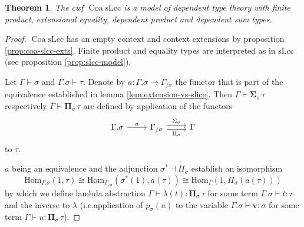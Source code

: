 \documentclass[a4paper]{article}
\newtheorem{theorem}{Theorem}
\theoremstyle{remark}
\theoremstyle{definition}
\begin{document}
\begin{theorem}
  \label{th:lcc-supports-types}
  The cwf $\operatorname{Coa} \mathrm{sLcc}$ is a model of dependent type theory with finite product, extensional equality, dependent product and dependent sum types.
\end{theorem}
\begin{proof}
  $\operatorname{Coa} \mathrm{sLcc}$ has an empty context and context extensions by proposition \ref{prop:coa-slcc-exts}.
  Finite product and equality types are interpreted as in $\mathrm{sLcc}$ (see proposition \ref{prop:slcc-model}).

  Let $\Gamma \vdash \sigma$ and $\Gamma.\sigma \vdash \tau$.
  Denote by $a : \Gamma.\sigma \rightarrow \Gamma_{/ \sigma}$ the functor that is part of the equivalence established in lemma \ref{lem:extension-vs-slice}.
  Then $\Gamma \vdash \mathbf{\Sigma}_\sigma \, \tau$ respectively $\Gamma \vdash \mathbf{\Pi}_\sigma \, \tau$ are defined by application of the functors
  \begin{equation}
    \begin{tikzcd}
      \Gamma.\sigma \arrow[r, "a"] & \Gamma_{/ \sigma} \arrow[r, shift left, "\Sigma_\sigma"] \arrow[r, shift right, "\Pi_\sigma"'] & \Gamma
    \end{tikzcd}
  \end{equation}
  to $\tau$.

  $a$ being an equivalence and the adjunction $\sigma^* \dashv \Pi_\sigma$ establish an isomorphism
  \begin{equation}
    \mathrm{Hom}_{\Gamma.\sigma}(1, \tau) \cong \mathrm{Hom}_{\Gamma_{/ \sigma}}(\sigma^*(1), a(\tau)) \cong \mathrm{Hom}_{\Gamma}(1, \Pi_\sigma(a(\tau)))
  \end{equation}
  by which we define lambda abstraction $\Gamma \vdash \lambda(t) : \mathbf{\Pi}_\sigma \, \tau$ for some term $\Gamma.\sigma \vdash t : \tau$ and the inverse to $\lambda$ (i.e.\@ application of $p_\sigma(u)$ to the variable $\Gamma.\sigma \vdash \mathbf{v} : \sigma$ for some term $\Gamma \vdash u : \mathbf{\Pi}_\sigma \, \tau$).


\end{proof}
\end{document}

